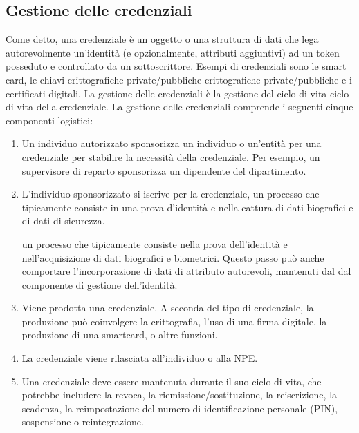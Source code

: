 \subsection{Gestione delle credenziali}
Come detto, una credenziale è un oggetto o una struttura di dati che lega autorevolmente un'identità (e opzionalmente, attributi aggiuntivi) ad un token posseduto e controllato da un sottoscrittore. Esempi di credenziali sono le smart card, le chiavi crittografiche private/pubbliche crittografiche private/pubbliche e i certificati digitali. La gestione delle credenziali è la gestione del ciclo di vita ciclo di vita della credenziale.
\singlespacing
La gestione delle credenziali comprende i seguenti cinque componenti logistici:
\begin{enumerate}
    \item Un individuo autorizzato sponsorizza un individuo o un'entità per una credenziale per stabilire la necessità della credenziale. Per esempio, un supervisore di reparto sponsorizza un dipendente del dipartimento.

    \item L'individuo sponsorizzato si iscrive per la credenziale, un processo che tipicamente consiste in una prova d'identità e nella cattura di dati biografici e di dati di sicurezza.

un processo che tipicamente consiste nella prova dell'identità e nell'acquisizione di dati biografici e biometrici. Questo passo può anche comportare l'incorporazione di dati di attributo autorevoli, mantenuti dal dal componente di gestione dell'identità.

    \item Viene prodotta una credenziale. A seconda del tipo di credenziale, la produzione può coinvolgere la crittografia, l'uso di una firma digitale, la produzione di una smartcard, o altre funzioni.

    \item La credenziale viene rilasciata all'individuo o alla NPE.
    
    \item Una credenziale deve essere mantenuta durante il suo ciclo di vita, che potrebbe includere la revoca, la riemissione/sostituzione, la reiscrizione, la scadenza, la reimpostazione del numero di identificazione personale (PIN), sospensione o reintegrazione.
\end{enumerate}
\newpage
